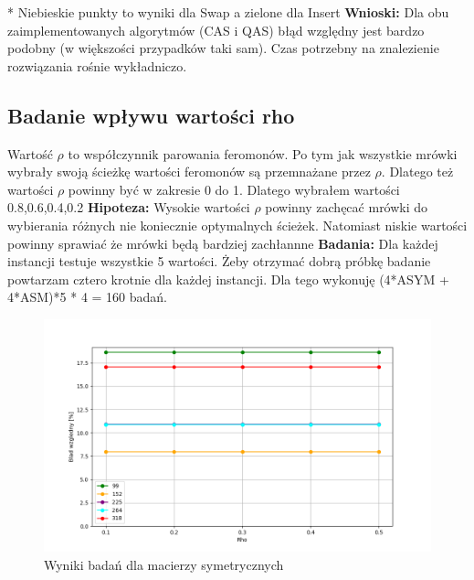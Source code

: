 \documentclass{article}
\begin{document}
        \FloatBarrier
        * Niebieskie punkty to wyniki dla Swap a zielone dla Insert\linebreak
        \textbf{Wnioski: } Dla obu zaimplementowanych algorytmów (CAS i QAS) błąd względny
        jest bardzo podobny (w większości przypadków taki sam). Czas potrzebny na znalezienie
        rozwiązania rośnie wykładniczo.
      \subsection{Badanie wpływu wartości rho}
        Wartość $\rho$ to współczynnik parowania feromonów. Po tym jak wszystkie
        mrówki wybrały swoją ścieżkę wartości feromonów są przemnażane przez $\rho$.
        Dlatego też wartości $\rho$ powinny być w zakresie 0 do 1. Dlatego wybrałem
        wartości 0.8,0.6,0.4,0.2\linebreak
        \textbf{Hipoteza: } Wysokie wartości $\rho$ powinny zachęcać mrówki do wybierania
        różnych nie koniecznie optymalnych ścieżek. Natomiast niskie wartości powinny 
        sprawiać że mrówki będą bardziej zachłannne\linebreak
        \textbf{Badania: } Dla każdej instancji testuje wszystkie 5 wartości. 
        Żeby otrzymać dobrą próbkę badanie powtarzam cztero krotnie dla każdej 
        instancji. Dla tego wykonuję (4*ASYM + 4*ASM)*5 * 4 = 160 badań.\linebreak
        \FloatBarrier
        
        \FloatBarrier
        \begin{figure}[ht]
          \centering
          \includegraphics[width=\textwidth]{src/plots/symAoRho.png}
          \caption{Wyniki badań dla macierzy symetrycznych}
          \label{fig:symRho}
        \end{figure}
\end{document}
